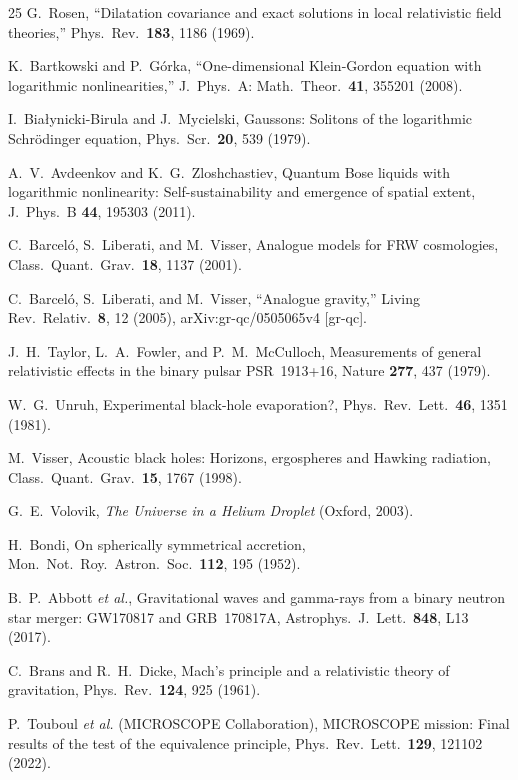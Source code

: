 \documentclass[12pt, a4paper]{article}
\begin{document}
\begin{thebibliography}{25}
G.~Rosen,
``Dilatation covariance and exact solutions in local relativistic field theories,''
Phys.\ Rev.\ \textbf{183}, 1186 (1969).

K.~Bartkowski and P.~G\'{o}rka,
``One-dimensional Klein-Gordon equation with logarithmic nonlinearities,''
J.\ Phys.\ A: Math.\ Theor.\ \textbf{41}, 355201 (2008).

I.~Bia\l{}ynicki-Birula and J.~Mycielski,
Gaussons: Solitons of the logarithmic Schr\"{o}dinger equation,
Phys.\ Scr.\ \textbf{20}, 539 (1979).

A.~V.~Avdeenkov and K.~G.~Zloshchastiev,
Quantum Bose liquids with logarithmic nonlinearity: Self-sustainability and emergence of spatial extent,
J.\ Phys.\ B \textbf{44}, 195303 (2011).

C.~Barcel\'{o}, S.~Liberati, and M.~Visser,
Analogue models for FRW cosmologies,
Class.\ Quant.\ Grav.\ \textbf{18}, 1137 (2001).

C.~Barceló, S.~Liberati, and M.~Visser,
``Analogue gravity,''
Living Rev.\ Relativ.\ \textbf{8}, 12 (2005),
arXiv:gr-qc/0505065v4 [gr-qc].

J.~H.~Taylor, L.~A.~Fowler, and P.~M.~McCulloch,
Measurements of general relativistic effects in the
binary pulsar PSR~1913+16,
Nature \textbf{277}, 437 (1979).

W.~G.~Unruh,
Experimental black-hole evaporation?,
Phys.\ Rev.\ Lett.\ \textbf{46}, 1351 (1981).

M.~Visser,
Acoustic black holes: Horizons, ergospheres and Hawking radiation,
Class.\ Quant.\ Grav.\ \textbf{15}, 1767 (1998).

G.~E.~Volovik,
\emph{The Universe in a Helium Droplet} (Oxford, 2003).

H.~Bondi,
On spherically symmetrical accretion,
Mon.\ Not.\ Roy.\ Astron.\ Soc.\ \textbf{112}, 195 (1952).

B.~P.~Abbott \emph{et al.},
Gravitational waves and gamma-rays from a binary neutron star merger: GW170817 and GRB~170817A,
Astrophys.\ J.\ Lett.\ \textbf{848}, L13 (2017).

C.~Brans and R.~H.~Dicke,
Mach's principle and a relativistic theory of gravitation,
Phys.\ Rev.\ \textbf{124}, 925 (1961).

P.~Touboul \emph{et al.} (MICROSCOPE Collaboration),
MICROSCOPE mission: Final results of the test of the equivalence principle,
Phys.\ Rev.\ Lett.\ \textbf{129}, 121102 (2022).

\end{thebibliography}
\end{document}
